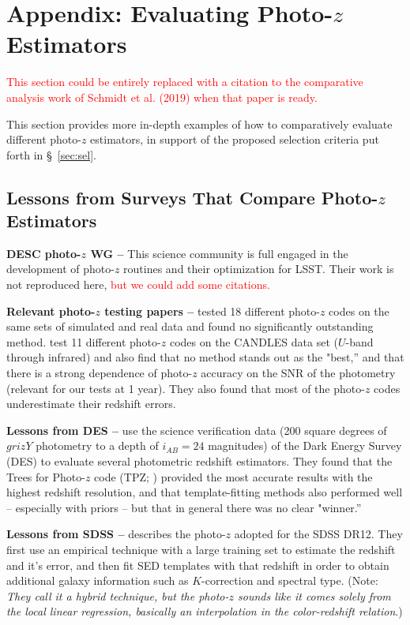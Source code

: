 \documentclass[DM,lsstdraft,toc]{lsstdoc}
\begin{document}
\clearpage
\section{Appendix: Evaluating Photo-$z$ Estimators}\label{sec:eval}

\textcolor{red}{This section could be entirely replaced with a citation to the comparative analysis work of Schmidt et al. (2019) when that paper is ready.}

This section provides more in-depth examples of how to comparatively evaluate different photo-$z$ estimators, in support of the proposed selection criteria put forth in \S~\ref{sec:sel}.


\subsection{Lessons from Surveys That Compare Photo-$z$ Estimators}\label{ssec:eval_lit}

\textbf{DESC photo-$z$ WG --} This science community is full engaged in the development of photo-$z$ routines and their optimization for LSST.
Their work is not reproduced here, \textcolor{red}{but we could add some citations.}

\textbf{Relevant photo-$z$ testing papers --} \cite{2010A&A...523A..31H} tested 18 different photo-$z$ codes on the same sets of simulated and real data and found no significantly outstanding method. 
\cite{2013ApJ...775...93D} test 11 different photo-$z$ codes on the CANDLES data set ($U$-band through infrared) and also find that no method stands out as the "best,'' and that there is a strong dependence of photo-$z$ accuracy on the SNR of the photometry (relevant for our tests at 1 year). 
They also found that most of the photo-$z$ codes underestimate their redshift errors.

\textbf{Lessons from DES --} \cite{2014MNRAS.445.1482S} use the science verification data (200 square degrees of $grizY$ photometry to a depth of $i_{AB}=24$ magnitudes) of the Dark Energy Survey (DES) to evaluate several photometric redshift estimators. 
They found that the Trees for Photo-$z$ code (TPZ; \citealt{2013ascl.soft04011C}) provided the most accurate results with the highest redshift resolution, and that template-fitting methods also performed well -- especially with priors -- but that in general there was no clear "winner.''

\textbf{Lessons from SDSS --} \cite{2016MNRAS.460.1371B} describes the photo-$z$ adopted for the SDSS DR12. They first use an empirical technique with a large training set to estimate the redshift and it's error, and then fit SED templates with that redshift in order to obtain additional galaxy information such as $K$-correction and spectral type. (Note: \textit{They call it a hybrid technique, but the photo-$z$ sounds like it comes solely from the local linear regression, basically an interpolation in the color-redshift relation}.)
\end{document}

